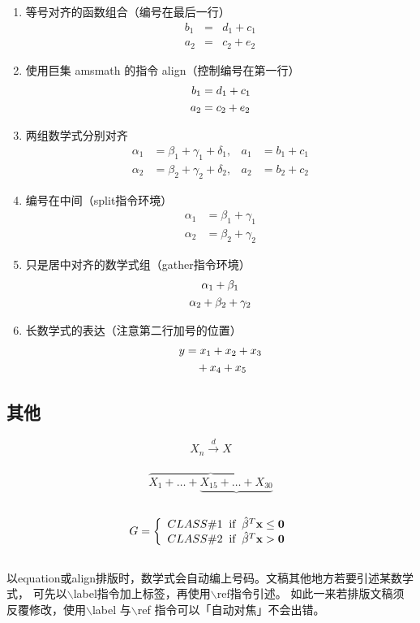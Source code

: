 \begin{enumerate}
    \item 等号对齐的函数组合（编号在最后一行）
        \begin{eqnarray}
\nonumber b_1 &=& d_1+c_1 \\
          a_2 &=& c_2+e_2
        \end{eqnarray}

    \item 使用巨集 amsmath 的指令 align（控制编号在第一行）
        \begin{align}
            b_1 &= d_1+c_1\\
            a_2 &= c_2+e_2 \notag
        \end{align}

    \item 两组数学式分别对齐
    \begin{align}
        \alpha_1 &= \beta_1+\gamma_1+\delta_1, &a_1 &= b_1+c_1\\
        \alpha_2 &= \beta_2+\gamma_2+\delta_2, &a_2 &= b_2+c_2
    \end{align}

    \item 编号在中间（split指令环境）
        \begin{equation}
            \begin{split}
                \alpha_1 &= \beta_1+\gamma_1\\
                \alpha_2 &= \beta_2+\gamma_2
            \end{split}
        \end{equation}
    \item 只是居中对齐的数学式组（gather指令环境）
        \begin{gather}
        \alpha_1 + \beta_1\notag\\
        \alpha_2 + \beta_2 + \gamma_2\notag
        \end{gather}

    \item 长数学式的表达（注意第二行加号的位置）
        \begin{align}
            y   &= x_1 + x_2 + x_3 \notag\\
                &\quad + x_4 + x_5
        \end{align}
\end{enumerate}


\subsection{其他}

  $$X_{n} \stackrel{d}{\longrightarrow} X$$\\
  $$\overbrace{X_{1} + \ldots + \underbrace{X_{15} + \ldots + X_{30}}}$$\\
  \begin{equation*}
    G = \left\{\begin{array}{l}
          CLASS\#1 \;\;\mbox{if} \;\; \hat{\beta}^T\bf{x} \leq 0 \\
          CLASS\#2 \;\;\mbox{if} \;\; \hat{\beta}^T\bf{x} > 0
        \end{array}\right.
  \end{equation*}\\

以equation或align排版时，数学式会自动编上号码。文稿其他地方若要引述某数学式，
可先以$\backslash$label指令加上标签，再使用$\backslash$ref指令引述。
如此一来若排版文稿须反覆修改，使用$\backslash$label 与$\backslash$ref 指令可以「自动对焦」不会出错。
